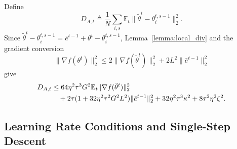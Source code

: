 \documentclass[conference]{IEEEtran}
\begin{document}
Define
\begin{equation}
    D_{A,t}
    \triangleq
    \frac1N\sum_{i,s}\mathbb{E}_t\|\tilde\theta^t-\theta_i^{t,s-1}\|_2^2.
\end{equation}
Since $\tilde\theta^t-\theta_i^{t,s-1}=\bar e^{t-1}+\theta^t-\theta_i^{t,s-1}$, Lemma~\ref{lemma:local_div} and the gradient conversion
\begin{equation}
    \|\nabla f(\theta^t)\|_2^2
    \le
    2\|\nabla f(\tilde\theta^t)\|_2^2+2L^2\|\bar e^{t-1}\|_2^2
\end{equation}
give
\begin{align}
    \label{eqn:psi_bound}
    D_{A,t}
    &\le
    64\eta^2\tau^3G^2\mathbb{E}_t\|\nabla f(\tilde\theta^t)\|_2^2
    \notag\\
    &\quad+
    2\tau(1+32\eta^2\tau^2G^2L^2)\|\bar e^{t-1}\|_2^2
    +32\eta^2\tau^3\kappa^2+8\tau^2\eta^2\zeta^2.
\end{align}

\subsection{Learning Rate Conditions and Single-Step Descent}
\end{document}
